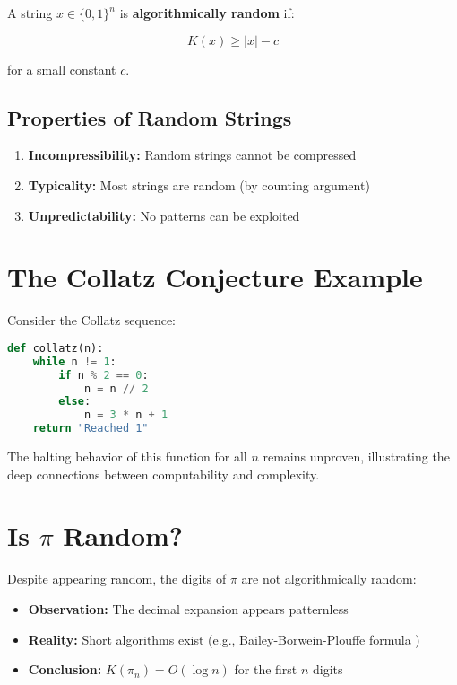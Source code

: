\documentclass[12pt,a4paper]{report}
\begin{document}
\begin{definition}
A string $x \in \{0,1\}^n$ is \textbf{algorithmically random} if:

\begin{equation}
K(x) \geq |x| - c
\end{equation}

for a small constant $c$.
\end{definition}

\subsection{Properties of Random Strings}

\begin{enumerate}
    \item \textbf{Incompressibility:} Random strings cannot be compressed
    \item \textbf{Typicality:} Most strings are random (by counting argument)
    \item \textbf{Unpredictability:} No patterns can be exploited
\end{enumerate}

\section{The Collatz Conjecture Example}

Consider the Collatz sequence:

\begin{lstlisting}[language=Python, caption=Collatz Sequence]
def collatz(n):
    while n != 1:
        if n % 2 == 0:
            n = n // 2
        else:
            n = 3 * n + 1
    return "Reached 1"
\end{lstlisting}

The halting behavior of this function for all $n$ remains unproven, illustrating the deep connections between computability and complexity.

\section{Is $\pi$ Random?}

Despite appearing random, the digits of $\pi$ are not algorithmically random:

\begin{itemize}
    \item \textbf{Observation:} The decimal expansion appears patternless
    \item \textbf{Reality:} Short algorithms exist (e.g., Bailey-Borwein-Plouffe formula \cite{bailey1997rapid})
    \item \textbf{Conclusion:} $K(\pi_n) = O(\log n)$ for the first $n$ digits
\end{itemize}
\end{document}
